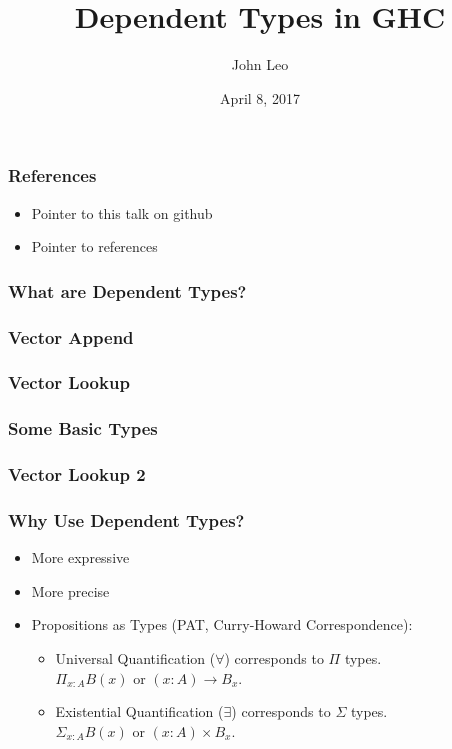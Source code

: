 \documentclass{beamer}
\title{Dependent Types in GHC}
\author{John Leo}
\institute{Halfaya Research}
\date{April 8, 2017}
\begin{document}
 
\frame{\titlepage}
 
\begin{frame}\frametitle{References}
\begin{itemize}
\item Pointer to this talk on github
\item Pointer to references
\end{itemize}
\end{frame}

\begin{frame}\frametitle{What are Dependent Types?}
\end{frame}

\begin{frame}\frametitle{Vector Append}
\end{frame}

\begin{frame}\frametitle{Vector Lookup}
\end{frame}

\begin{frame}\frametitle{Some Basic Types}
\end{frame}

\begin{frame}\frametitle{Vector Lookup 2}
\end{frame}

\begin{frame}\frametitle{Why Use Dependent Types?}
\begin{itemize}
\item More expressive
\item More precise
\item Propositions as Types (PAT, Curry-Howard Correspondence):
\begin{itemize}
\item Universal Quantification ($\forall$) corresponds to $\Pi$ types.\\
  $\Pi_{x : A} B(x)$ or $(x : A) \to B_x$.
\item Existential Quantification ($\exists$) corresponds to $\Sigma$ types.\\
  $\Sigma_{x : A} B(x)$ or $(x : A) \times B_x$.
\end{itemize}
\end{itemize}
\end{frame}
\end{document}
